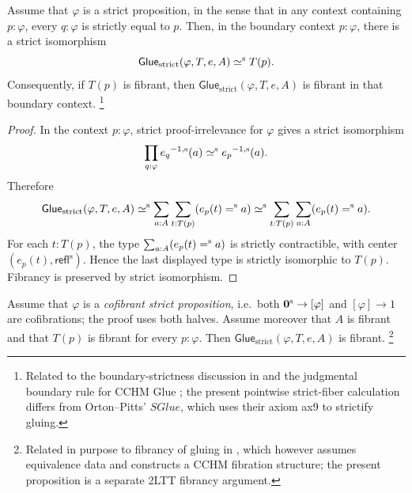 \begin{longversion}
\begin{proposition}\label{prop:strict-glue-boundary}
Assume that \(\varphi\) is a strict proposition, in the sense that in any
context containing \(p:\varphi\), every \(q:\varphi\) is strictly equal to
\(p\). Then, in the boundary context \(p:\varphi\), there is a strict
isomorphism
\[
  \mathsf{Glue}_{\mathrm{strict}}(\varphi,T,e,A) \mathrel{\simeq^\textup{s}} T(p).
\]
Consequently, if \(T(p)\) is fibrant, then
\(\mathsf{Glue}_{\mathrm{strict}}(\varphi,T,e,A)\) is fibrant in that boundary
context.
\footnote{Related to the boundary-strictness discussion in \citet[Def.~6.11, Eq.~(6.9)]{OrtonPitts2018} and the judgmental boundary rule for CCHM Glue \citep[Fig.~4]{CCHM2018}; the present pointwise strict-fiber calculation differs from Orton--Pitts' \(SGlue\), which uses their axiom ax9 to strictify gluing.}
\end{proposition}

\begin{proof}
In the context \(p:\varphi\), strict proof-irrelevance for \(\varphi\) gives a
strict isomorphism
\[
  \prod_{q:\varphi}{e_q}^{-1, \textup{s}}(a)
  \mathrel{\simeq^\textup{s}}
  {e_p}^{-1, \textup{s}}(a).
\]
Therefore
\[
  \mathsf{Glue}_{\mathrm{strict}}(\varphi,T,e,A)
  \mathrel{\simeq^\textup{s}}
  \sum_{a:A}\sum_{t:T(p)}(e_p(t)\mathrel{=^\textup{s}} a)
  \mathrel{\simeq^\textup{s}}
  \sum_{t:T(p)}\sum_{a:A}(e_p(t)\mathrel{=^\textup{s}} a).
\]
For each \(t:T(p)\), the type \(\sum_{a:A}(e_p(t)\mathrel{=^\textup{s}} a)\) is strictly
contractible, with center \((e_p(t),\mathsf{refl}^{\mathrm{s}})\). Hence the
last displayed type is strictly isomorphic to \(T(p)\). Fibrancy is preserved
by strict isomorphism.
\end{proof}


\begin{proposition}\label{prop:strict-glue-fibrant-from-cofibrancy}
Assume that \(\varphi\) is a \emph{cofibrant strict proposition},
i.e.\ both \(\mathbf{0}^\textup{s}\to[\varphi]\) and
\([\varphi]\to 1\) are cofibrations; the proof uses both halves. Assume
moreover that \(A\) is
fibrant and that \(T(p)\) is fibrant for every \(p:\varphi\). Then
\(\mathsf{Glue}_{\mathrm{strict}}(\varphi,T,e,A)\) is fibrant.
\footnote{Related in purpose to fibrancy of gluing in \citet[Thm.~6.8]{OrtonPitts2018}, which however assumes equivalence data and constructs a CCHM fibration structure; the present proposition is a separate 2LTT fibrancy argument.}
\end{proposition}


\end{longversion}

